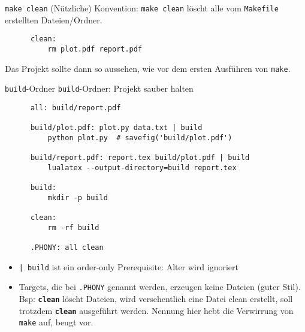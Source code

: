 
\begin{frame}[fragile]{\texttt{make clean}}
  (Nützliche) Konvention: \texttt{make clean} löscht alle vom \texttt{Makefile} erstellten Dateien/Ordner.

  \begin{center}
    \begin{verbatim}
      clean:
          rm plot.pdf report.pdf
    \end{verbatim}
  \end{center}

  Das Projekt sollte dann so aussehen, wie vor dem ersten Ausführen von \texttt{make}.
\end{frame}

\begin{frame}[fragile]{\texttt{build}-Ordner}
  \texttt{build}-Ordner: Projekt sauber halten

  \begin{center}
    \begin{verbatim}
      all: build/report.pdf

      build/plot.pdf: plot.py data.txt | build
          python plot.py  # savefig('build/plot.pdf')

      build/report.pdf: report.tex build/plot.pdf | build
          lualatex --output-directory=build report.tex

      build:
          mkdir -p build

      clean:
          rm -rf build

      .PHONY: all clean
    \end{verbatim}
  \end{center}

  \begin{itemize}
    \item \texttt{| build} ist ein order-only Prerequisite: Alter wird ignoriert
    \item Targets, die bei \texttt{.PHONY} genannt werden, erzeugen keine Dateien (guter Stil).
        Bsp: \textbf{\texttt{clean}} löscht Dateien, wird versehentlich eine Datei clean erstellt,
        soll trotzdem \textbf{\texttt{clean}} ausgeführt werden.
        Nennung hier hebt die Verwirrung von \texttt{make} auf, beugt vor.
  \end{itemize}
\end{frame}


